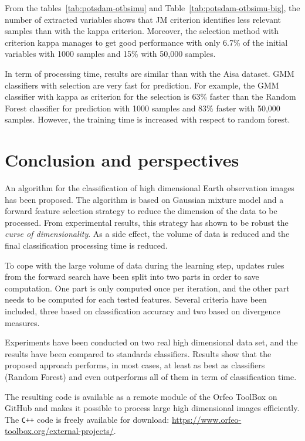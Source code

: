 \documentclass[journal,10pt]{IEEEtran}
\begin{document}
    From        the        tables~\ref{tab:potsdam-otbsimu}        and
    Table~\ref{tab:potsdam-otbsimu-big},   the  number   of  extracted
    variables shows that JM criterion identifies less relevant samples
    than with the kappa criterion. Moreover, the selection method with
    criterion kappa manages to get good performance with only 6.7\% of
    the  initial variables  with  1000 samples  and  15\% with  50,000
    samples.

    In term of processing time, results are similar than with the Aisa
    dataset.  GMM  classifiers  with   selection  are  very  fast  for
    prediction.  For  example,  the   GMM  classifier  with  kappa  as
    criterion for the selection is  63\% faster than the Random Forest
    classifier for prediction  with 1000 samples and  83\% faster with
    50,000  samples.  However, the  training  time  is increased  with
    respect to random forest.

\section{Conclusion and perspectives}
\label{sec:conclusion}

An algorithm for the classification of high dimensional Earth observation images has been proposed. The algorithm is based on Gaussian mixture model and a forward feature selection strategy to reduce the dimension of the data to be processed. From experimental results, this strategy has shown to be robust the \emph{curse of dimensionality}. As a side effect, the volume of data is reduced and the final classification processing time is reduced. 

To cope with the large volume of data during the learning step, updates rules from the forward search have been split into two parts in order to save computation. One part is only computed once per iteration, and the other part needs to be computed for each tested features. Several criteria have been included, three based on classification accuracy and two based on divergence measures.

Experiments have been conducted on two real high dimensional data set, and the results have been compared to standards classifiers. Results show that the proposed approach  performs, in most cases, at least as best as classifiers (Random Forest) and even outperforms all of them in term of classification time.

The resulting code is available as a remote module of the Orfeo ToolBox on GitHub and makes it possible to process large high dimensional images efficiently. The \texttt{C++} code is freely available for download: \url{https://www.orfeo-toolbox.org/external-projects/}.
\end{document}
